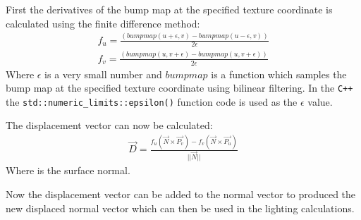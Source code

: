 First the derivatives of the bump map at the specified texture coordinate is
calculated using the finite difference method:
\begin{equation}
\begin{split}
  f_{u} = \frac{(bumpmap(u + \epsilon, v) - bumpmap(u - \epsilon, v))}
  {2\epsilon} \\
  f_{v} = \frac{(bumpmap(u, v + \epsilon) - bumpmap(u, v + \epsilon))}
  {2\epsilon}
\end{split}
\end{equation}
Where $\epsilon$ is a very small number and $bumpmap$ is a function which
samples the bump map at the specified texture coordinate using bilinear
filtering. In the \verb|C++| the \verb|std::numeric_limits::epsilon()| function
code is used as the $\epsilon$ value.

The displacement vector can now be calculated:
\begin{equation}
\begin{split}
  \vec{D} = \frac{f_{u}(\vec{N}\times\vec{P_{v}}) -
  f_{v}(\vec{N}\times\vec{P_{u}})}{||\vec{N}||}
\end{split}
\end{equation}
Where  is the surface normal.

Now the displacement vector can be added to the normal vector to produced the
new displaced normal vector which can then be used in the lighting calculations.

